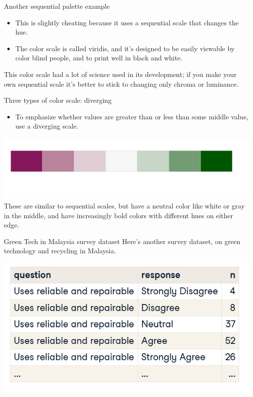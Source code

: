 \documentclass[
  ignorenonframetext,
]{beamer}
\providecommand{\tightlist}{%
  \setlength{\itemsep}{0pt}\setlength{\parskip}{0pt}}
\begin{document}
\begin{frame}{Another sequential palette example}
\label{another-sequential-palette-example-1}
\begin{itemize}
\item
  This is slightly cheating because it uses a sequential scale that
  changes the hue.
\item
  The color scale is called viridis, and it's designed to be easily
  viewable by color blind people, and to print well in black and white.
\end{itemize}

This color scale had a lot of science used in its development; if you
make your own sequential scale it's better to stick to changing only
chroma or luminance.
\end{frame}

\begin{frame}{Three types of color scale: diverging}
\label{three-types-of-color-scale-diverging}
\begin{itemize}
\tightlist
\item
  To emphasize whether values are greater than or less than some middle
  value, use a diverging scale.
\end{itemize}

\includegraphics{../images/im85.png}\\
These are similar to sequential scales, but have a neutral color like
white or gray in the middle, and have increasingly bold colors with
different hues on either edge.
\end{frame}

\begin{frame}{Green Tech in Malaysia survey dataset}
\label{green-tech-in-malaysia-survey-dataset}
Here's another survey dataset, on green technology and recycling in
Malaysia.

\includegraphics{../images/im86.png}
\end{frame}
\end{document}
